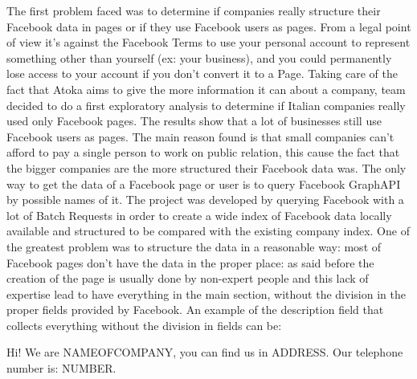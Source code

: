 The first problem faced was to determine if companies really structure their Facebook data in pages or if they use Facebook users as pages. 
From a legal point of view it's against the Facebook Terms to use your personal account to represent something other than yourself (ex: your business), and you could permanently lose access to your account if you don't convert it to a Page. Taking care of the fact that Atoka aims to give the more information it can about a company, team decided to do a first exploratory analysis to determine if Italian companies really used only Facebook pages. The results show that a lot of businesses still use Facebook users as pages. The main reason found is that small companies can't afford to pay a single person to work on public relation, this cause the fact that the bigger companies are the more structured their Facebook data was.
\cite{facebooksum}
The only way to get the data of a Facebook page or user is to query Facebook GraphAPI\cite{graphapi} by possible names of it. The project was developed by querying Facebook with a lot of Batch Requests in order to create a wide index of Facebook data locally available and structured to be compared with the existing company index. One of the greatest problem was to structure the data in a reasonable way: most of Facebook pages don't have the data in the proper place: as said before the creation of the page is usually done by non-expert people and this lack of expertise lead to have everything in the main section, without the division in the proper fields provided by Facebook.
An example of the description field that collects everything without the division in fields can be:



Hi! We are NAMEOFCOMPANY, you can find us in ADDRESS. Our telephone number is: NUMBER.


